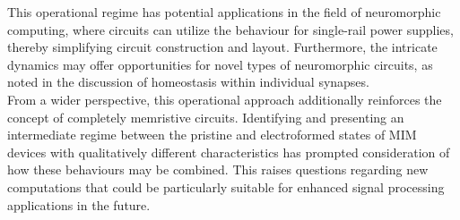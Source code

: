 \noindent This operational regime has potential applications in the field of neuromorphic computing, where circuits can utilize the behaviour for single-rail power supplies, thereby simplifying circuit construction and layout. Furthermore, the intricate dynamics may offer opportunities for novel types of neuromorphic circuits, as noted in the discussion of homeostasis within individual synapses.\\

\noindent From a wider perspective, this operational approach additionally reinforces the concept of completely memristive circuits. Identifying and presenting an intermediate regime between the pristine and electroformed states of MIM devices with qualitatively different characteristics has prompted consideration of how these behaviours may be combined. This raises questions regarding new computations that could be particularly suitable for enhanced signal processing applications in the future.